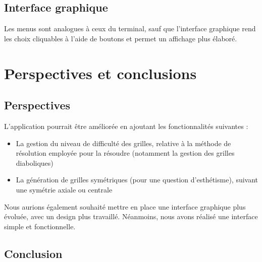 \documentclass[a4paper, 12pt]{article}
\begin{document}
\subsection{Interface graphique}

	\par Les menus sont analogues à ceux du terminal, sauf que l'interface graphique rend les choix cliquables à l'aide de boutons et permet un affichage plus élaboré.

\clearpage
\section{Perspectives et conclusions}

\subsection{Perspectives}

	\par L'application pourrait être améliorée en ajoutant les fonctionnalités suivantes :
	\begin{itemize}
		\item La gestion du niveau de difficulté des grilles, relative à la méthode de résolution employée pour la résoudre (notamment la gestion des grilles diaboliques)
		\item La génération de grilles symétriques (pour une question d'esthétisme), suivant une symétrie axiale ou centrale
	\end{itemize}

	\par Nous aurions également souhaité mettre en place une interface graphique plus évoluée, avec un design plus travaillé. Néanmoins, nous avons réalisé une interface simple et fonctionnelle.

\subsection{Conclusion}
\end{document}
